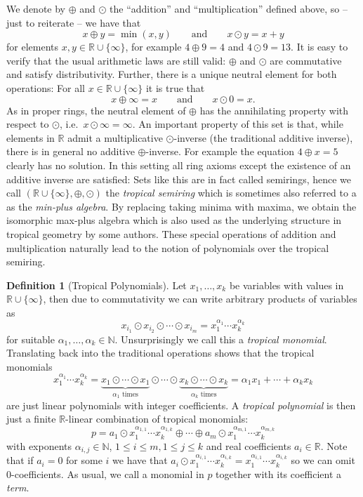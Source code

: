 \documentclass[
  paper=a4,
  titlepage,
  bibliography=totoc,
  listof=totoc,
  pagesize=pdftex
]{scrartcl}
\numberwithin{figure}{section}
\numberwithin{equation}{section}
\numberwithin{table}{section}
\newcommand*\setR{\mathds{R}}
\newcommand*\setN{\mathds{N}}
\theoremstyle{definition}
\newtheorem{definition}{Definition}
\numberwithin{definition}{section}
\begin{document}
We denote by $\oplus$ and $\odot$ the \enquote{addition} and \enquote{multiplication}
defined above, so -- just to reiterate -- we have that
\[
  x \oplus y = \min(x,y)
  \qquad \text{and} \qquad
  x \odot y = x+y
\]
for elements $x,y\in \setR\cup\{\infty\}$, for example $4\oplus9 = 4$ and $4\odot9 = 13$.
It is easy to verify that the usual arithmetic laws are still valid: $\oplus$ and $\odot$
are commutative and satisfy distributivity. Further, there is a unique neutral  element
for both operations: For all $x\in \setR\cup \{\infty\}$ it is true that
\[
  x \oplus \infty = x
  \qquad \text{and} \qquad
  x \odot 0 = x.
\]
As in proper rings, the neutral element of $\oplus$ has the annihilating property with
respect to $\odot$, i.e.\ $x\odot \infty = \infty$. An important property of this set is
that, while elements in $\setR$ admit a multiplicative $\odot$-inverse (the traditional
additive inverse), there is in general no additive $\oplus$-inverse. For example the
equation $4\oplus x = 5$ clearly has no solution. In this setting all ring axioms except
the existence of an additive inverse are satisfied: Sets like this are in fact called
semirings, hence we call $(\setR\cup \{\infty\}, \oplus, \odot)$ the \emph{tropical
semiring} which is sometimes also referred to a as the \emph{min-plus algebra}. By
replacing taking minima with maxima, we obtain the isomorphic max-plus algebra which is
also used as the underlying structure in tropical geometry by some authors. These special
operations of addition and multiplication naturally lead to the notion of polynomials over
the tropical semiring.

\begin{definition}[Tropical Polynomials]
  Let $x_1, \dots, x_k$ be variables with values in $\setR\cup\{\infty\}$, then due to
  commutativity we can write arbitrary products of variables as
  \[
    x_{i_1} \odot x_{i_2} \odot \cdots \odot x_{i_m}
    = x_1^{\alpha_1} \cdots x_k^{\alpha_k}
  \]
  for suitable $\alpha_1, \dots, \alpha_k \in \setN$. Unsurprisingly we call this a
  \emph{tropical monomial}. Translating back into the traditional operations shows that
  the tropical monomials
  \[
    x_1^{\alpha_1} \cdots x_k^{\alpha_k} =
    \underbrace{x_1\odot\cdots\odot x_1}_{\alpha_1 \text{ times}}
    \odot\cdots\odot
    \underbrace{x_k\odot\cdots\odot x_k}_{\alpha_k \text{ times}}
    = \alpha_1x_1 + \cdots + \alpha_kx_k
  \]
  are just linear polynomials with integer coefficients. A \emph{tropical polynomial} is
  then just a finite $\setR$-linear combination of tropical monomials:
  \[
    p = a_1 \odot x_1^{\alpha_{1,1}}\cdots x_k^{\alpha_{1,k}} \oplus \cdots \oplus
    a_m \odot x_1^{\alpha_{m,1}}\cdots x_k^{\alpha_{m,k}}
  \]
  with exponents $\alpha_{i,j} \in \setN$, $1\leq i \leq m, 1\leq j \leq k$ and real
  coefficients $a_i \in \setR$. Note that if $a_i = 0$ for some $i$ we have that $a_i\odot
  x_1^{\alpha_{i,1}}\cdots x_k^{\alpha_{i,k}} = x_1^{\alpha_{i,1}}\cdots
  x_k^{\alpha_{i,k}}$ so we can omit $0$-coefficients. As usual, we call a monomial in $p$
  together with its coefficient a \emph{term}.
  \label{def:tropPoly}
\end{definition}
\end{document}
